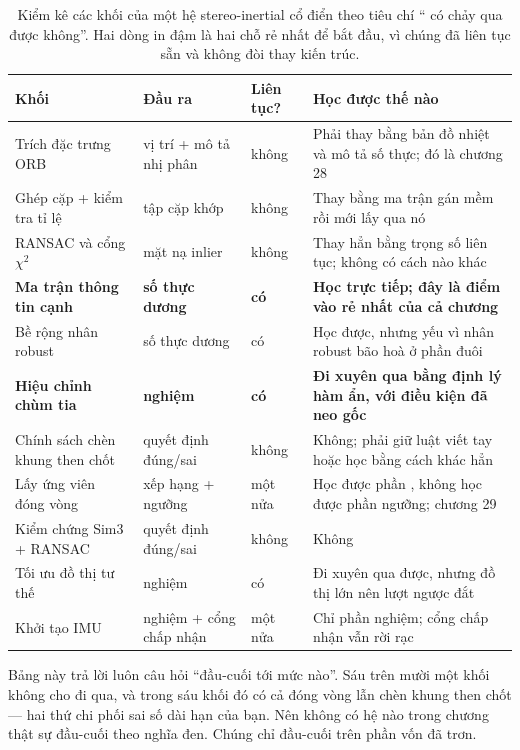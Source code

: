 \documentclass[../../deep_learning.tex]{subfiles}
\begin{document}
\begin{table}[H]\centering\footnotesize
\caption{Kiểm kê các khối của một hệ stereo-inertial cổ điển theo tiêu chí `` có chảy qua được không''. Hai dòng in đậm là hai chỗ rẻ nhất để bắt đầu, vì chúng đã liên tục sẵn và không đòi thay kiến trúc.}
\label{tab:f31-khoi-hoc-duoc}
\begin{tabularx}{\linewidth}{@{}L{3.5cm}L{3.1cm}L{1.9cm}Y@{}}
\toprule
\textbf{Khối} & \textbf{Đầu ra} & \textbf{Liên tục?} & \textbf{Học được thế nào}\\
\midrule
Trích đặc trưng ORB & vị trí + mô tả nhị phân & không & Phải thay bằng bản đồ nhiệt và mô tả số thực; đó là chương 28\\
Ghép cặp + kiểm tra tỉ lệ & tập cặp khớp & không & Thay bằng ma trận gán mềm rồi mới lấy  qua nó\\
RANSAC và cổng \(\chi^2\) & mặt nạ inlier & không & Thay hẳn bằng trọng số liên tục; không có cách nào khác\\
\textbf{Ma trận thông tin cạnh} & \textbf{số thực dương} & \textbf{có} & \textbf{Học trực tiếp; đây là điểm vào rẻ nhất của cả chương}\\
Bề rộng nhân robust & số thực dương & có & Học được, nhưng  yếu vì nhân robust bão hoà ở phần đuôi\\
\textbf{Hiệu chỉnh chùm tia} & \textbf{nghiệm} & \textbf{có} & \textbf{Đi xuyên qua bằng định lý hàm ẩn, với điều kiện đã neo gốc}\\
Chính sách chèn khung then chốt & quyết định đúng/sai & không & Không; phải giữ luật viết tay hoặc học bằng cách khác hẳn\\
Lấy ứng viên đóng vòng & xếp hạng + ngưỡng & một nửa & Học được phần , không học được phần ngưỡng; chương 29\\
Kiểm chứng Sim3 + RANSAC & quyết định đúng/sai & không & Không\\
Tối ưu đồ thị tư thế & nghiệm & có & Đi xuyên qua được, nhưng đồ thị lớn nên lượt ngược đắt\\
Khởi tạo IMU & nghiệm + cổng chấp nhận & một nửa & Chỉ phần nghiệm; cổng chấp nhận vẫn rời rạc\\
\bottomrule
\end{tabularx}
\end{table}

Bảng này trả lời luôn câu hỏi ``đầu-cuối tới mức nào''. Sáu trên mười một khối không cho  đi qua, và trong sáu khối đó có cả đóng vòng lẫn chèn khung then chốt --- hai thứ chi phối sai số dài hạn của bạn. Nên không có hệ nào trong chương thật sự đầu-cuối theo nghĩa đen. Chúng chỉ đầu-cuối trên phần vốn đã trơn.
\end{document}
